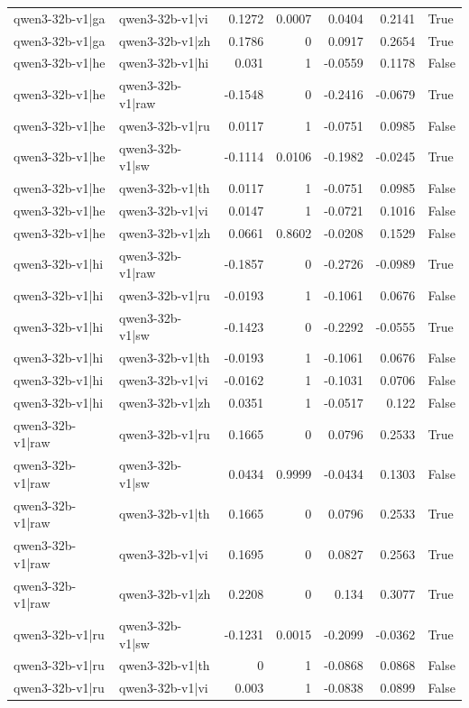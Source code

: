 \begin{table}
\begin{tabular}{l l r r r r l}
qwen3-32b-v1|ga & qwen3-32b-v1|vi & 0.1272 & 0.0007 & 0.0404 & 0.2141 & True \\
qwen3-32b-v1|ga & qwen3-32b-v1|zh & 0.1786 & 0 & 0.0917 & 0.2654 & True \\
qwen3-32b-v1|he & qwen3-32b-v1|hi & 0.031 & 1 & -0.0559 & 0.1178 & False \\
qwen3-32b-v1|he & qwen3-32b-v1|raw & -0.1548 & 0 & -0.2416 & -0.0679 & True \\
qwen3-32b-v1|he & qwen3-32b-v1|ru & 0.0117 & 1 & -0.0751 & 0.0985 & False \\
qwen3-32b-v1|he & qwen3-32b-v1|sw & -0.1114 & 0.0106 & -0.1982 & -0.0245 & True \\
qwen3-32b-v1|he & qwen3-32b-v1|th & 0.0117 & 1 & -0.0751 & 0.0985 & False \\
qwen3-32b-v1|he & qwen3-32b-v1|vi & 0.0147 & 1 & -0.0721 & 0.1016 & False \\
qwen3-32b-v1|he & qwen3-32b-v1|zh & 0.0661 & 0.8602 & -0.0208 & 0.1529 & False \\
qwen3-32b-v1|hi & qwen3-32b-v1|raw & -0.1857 & 0 & -0.2726 & -0.0989 & True \\
qwen3-32b-v1|hi & qwen3-32b-v1|ru & -0.0193 & 1 & -0.1061 & 0.0676 & False \\
qwen3-32b-v1|hi & qwen3-32b-v1|sw & -0.1423 & 0 & -0.2292 & -0.0555 & True \\
qwen3-32b-v1|hi & qwen3-32b-v1|th & -0.0193 & 1 & -0.1061 & 0.0676 & False \\
qwen3-32b-v1|hi & qwen3-32b-v1|vi & -0.0162 & 1 & -0.1031 & 0.0706 & False \\
qwen3-32b-v1|hi & qwen3-32b-v1|zh & 0.0351 & 1 & -0.0517 & 0.122 & False \\
qwen3-32b-v1|raw & qwen3-32b-v1|ru & 0.1665 & 0 & 0.0796 & 0.2533 & True \\
qwen3-32b-v1|raw & qwen3-32b-v1|sw & 0.0434 & 0.9999 & -0.0434 & 0.1303 & False \\
qwen3-32b-v1|raw & qwen3-32b-v1|th & 0.1665 & 0 & 0.0796 & 0.2533 & True \\
qwen3-32b-v1|raw & qwen3-32b-v1|vi & 0.1695 & 0 & 0.0827 & 0.2563 & True \\
qwen3-32b-v1|raw & qwen3-32b-v1|zh & 0.2208 & 0 & 0.134 & 0.3077 & True \\
qwen3-32b-v1|ru & qwen3-32b-v1|sw & -0.1231 & 0.0015 & -0.2099 & -0.0362 & True \\
qwen3-32b-v1|ru & qwen3-32b-v1|th & 0 & 1 & -0.0868 & 0.0868 & False \\
qwen3-32b-v1|ru & qwen3-32b-v1|vi & 0.003 & 1 & -0.0838 & 0.0899 & False \\

\end{tabular}
\end{table}
